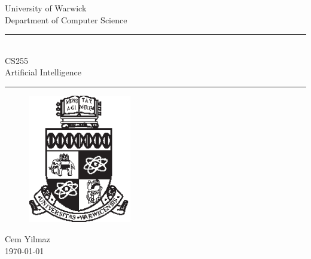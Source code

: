 \documentclass[a4paper]{article}
\theoremstyle{plain}
\theoremstyle{definition}
\theoremstyle{remark}
\begin{document}
	\begin{titlepage}
	\begin{center}
	\large
	University of Warwick \\
	Department of Computer Science \\
	\huge
	\vspace{50mm}
	\rule{\linewidth}{0.5pt} \\
	CS255 \\
	\vspace{5mm}
	\Large
	Artificial Intelligence
	\rule{\linewidth}{0.5pt}
	\vspace{5mm}
	\begin{figure}[H]
	\centering
	\includegraphics[width=0.4\textwidth]{crest_black.eps}
	\end{figure}
	\vspace{37mm}
	Cem Yilmaz \\
	\today
	\end{center}
	\end{titlepage}
	\tableofcontents
	\newpage
\end{document}
